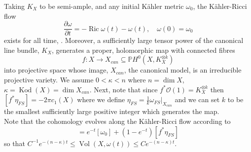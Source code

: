 \documentclass[12pt]{article}
\numberwithin{equation}{section}
\renewcommand{\P}{\mathbb{P}}
\newcommand{\OO}{\mathcal{O}}
\renewcommand{\d}{\partial}
\DeclareMathOperator{\Ric}{Ric}
\DeclareMathOperator{\Kod}{Kod}
\DeclareMathOperator{\Vol}{Vol}
\begin{document}
\noindent Taking $K_X$ to be semi-ample, and any initial K\"ahler metric $\omega_0$, the K\"ahler-Ricci flow
\begin{equation*}
    \frac{\d \omega}{\d t} = -\Ric \omega(t) - \omega(t), \quad \omega(0) = \omega_0
\end{equation*}
exists for all time, \cite{TZ06}. Moreover, a sufficiently large tensor power of the canonical line bundle, $K_X$, generates a proper, holomorphic map with connected fibres
\begin{equation*}
    f: X \to X_{can} \subseteq \P H^0(X,K_X^{\otimes k})
\end{equation*}
into projective space whose image, $X_{can}$, the canonical model, is an irreducible projective variety. We assume $0 < \kappa < n$ where $n = \dim X$, $\kappa = \Kod(X) = \dim X_{can}$. Next, note that since $f^*\OO(1) = K_X^{\otimes k}$ then $[f^*\eta_{FS}] = -2 \pi c_1(X)$ where we define $\eta_{FS} = \frac{1}{k} \omega_{FS}|_{X_{can}}$ and we can set $k$ to be the smallest sufficiently large positive integer which generates the map.\\

\noindent Note that the cohomology evolves along the K\"ahler-Ricci flow according to
\begin{equation*}
    [\omega(t)] = e^{-t} [\omega_0] + (1-e^{-t}) [f^*\eta_{FS}]
\end{equation*}
so that $C^{-1} e^{-(n -\kappa)t} \leq \Vol(X,\omega(t)) \leq C e^{-(n-\kappa)t}$.
\end{document}

